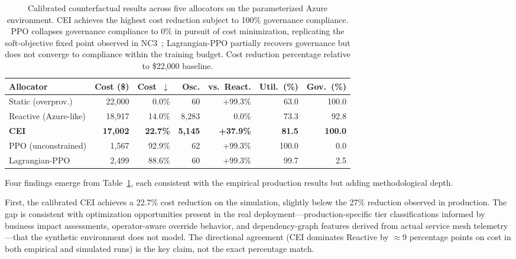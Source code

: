 \documentclass[runningheads]{llncs}
\begin{document}
\begin{table}[ht]
\caption{Calibrated counterfactual results across five allocators on the parameterized Azure environment. CEI achieves the highest cost reduction subject to 100\% governance compliance. PPO collapses governance compliance to 0\% in pursuit of cost minimization, replicating the soft-objective fixed point observed in NC3~\cite{paper1}; Lagrangian-PPO partially recovers governance but does not converge to compliance within the training budget. Cost reduction percentage relative to \$22{,}000 baseline.}
\label{tab:counterfactual}
\centering
\footnotesize
\setlength{\tabcolsep}{3.5pt}
\begin{tabular}{lrrrrrr}
\toprule
Allocator & Cost (\$) & Cost~$\downarrow$ & Osc. & vs.\ React. & Util.~(\%) & Gov.~(\%) \\
\midrule
Static (overprov.)    & 22{,}000          &  0.0\%             &    60          & +99.3\%             & 63.0          & 100.0          \\
Reactive (Azure-like) & 18{,}917          & 14.0\%             & 8{,}283        &  0.0\%              & 73.3          &  92.8          \\
\textbf{CEI}          & \textbf{17{,}002} & \textbf{22.7\%}    & \textbf{5{,}145} & \textbf{+37.9\%}  & \textbf{81.5} & \textbf{100.0} \\
PPO (unconstrained)   &  1{,}567          & 92.9\%             &    62          & +99.3\%             & 100.0         &   0.0          \\
Lagrangian-PPO        &  2{,}499          & 88.6\%             &    60          & +99.3\%             &  99.7         &   2.5          \\
\bottomrule
\end{tabular}
\end{table}

Four findings emerge from Table~\ref{tab:counterfactual}, each consistent with the empirical production results but adding methodological depth.

First, the calibrated CEI achieves a 22.7\% cost reduction on the simulation, slightly below the 27\% reduction observed in production. The gap is consistent with optimization opportunities present in the real deployment---production-specific tier classifications informed by business impact assessments, operator-aware override behavior, and dependency-graph features derived from actual service mesh telemetry---that the synthetic environment does not model. The directional agreement (CEI dominates Reactive by $\approx$9 percentage points on cost in both empirical and simulated runs) is the key claim, not the exact percentage match.
\end{document}
